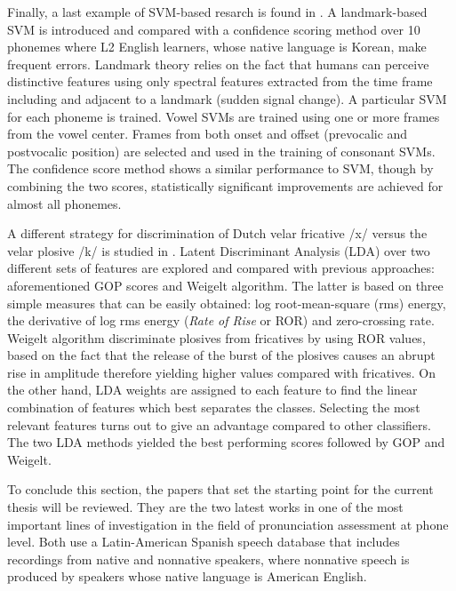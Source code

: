 Finally, a last example of SVM-based resarch is found in \cite{landmark_svm, landmark_svm_2}. 
A landmark-based SVM is introduced and compared with a confidence 
scoring method over 10 phonemes where 
L2 English learners, whose native language is Korean, make frequent errors. 
Landmark theory relies on the fact that humans can perceive distinctive
features using only spectral features extracted from the time frame including and adjacent to
a landmark (sudden signal change). A particular SVM for each phoneme is trained. Vowel SVMs are 
trained using one or more frames from the vowel center. Frames from both onset and offset
(prevocalic and postvocalic position) are selected and used in the training of consonant
SVMs. The confidence score method shows a similar performance to SVM, though by combining 
the two scores, statistically significant improvements are achieved for almost all phonemes.

A different strategy for discrimination of Dutch velar fricative /x/ versus the velar plosive
/k/ is studied in \cite{lda_weigelt}. Latent Discriminant Analysis (LDA) over two different sets
of features are explored and compared with previous approaches: aforementioned GOP scores and
Weigelt algorithm. The latter is based on three simple measures that can be easily obtained:
log root-mean-square (rms) energy, the derivative of log rms energy (\textit{Rate of Rise} or
ROR) and zero-crossing rate. Weigelt algorithm discriminate plosives from fricatives by using
ROR values, based on the fact that the release of the burst of the plosives causes an abrupt
rise in amplitude therefore yielding higher values compared with fricatives.
On the other hand, LDA weights are assigned to each feature to 
find the linear combination of features
which best separates the classes. Selecting the most relevant features turns out to give an
advantage compared to other classifiers. The two LDA methods yielded the best performing
scores followed by GOP and Weigelt.

To conclude this section, the papers that set the starting point for the current thesis will
be reviewed. They are the two latest works in one of the most important lines of investigation
in the field of pronunciation assessment at phone level. 
Both use a Latin-American Spanish speech database that includes recordings from 
native and nonnative speakers, where nonnative speech
is produced by speakers whose native language is American English.

